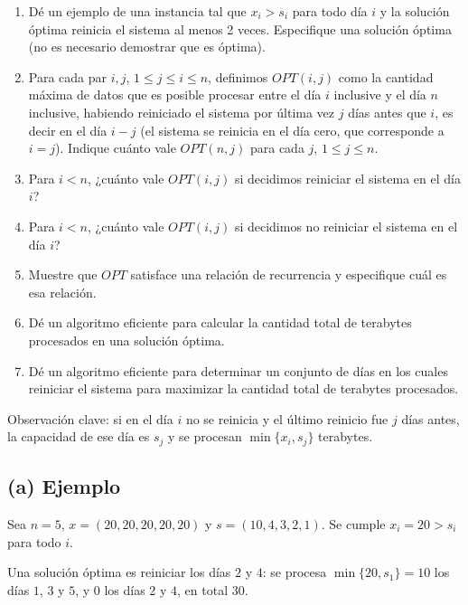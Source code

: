 \begin{enunciado}
\begin{enumerate}[label=(\alph*)]
\item Dé un ejemplo de una instancia tal que $x_i>s_i$ para todo día $i$ y la solución óptima reinicia el sistema al menos 2 veces. Especifique una solución óptima (no es necesario demostrar que es óptima).
\item Para cada par $i,j$, $1\le j\le i\le n$, definimos $OPT(i,j)$ como la cantidad máxima de datos que es posible procesar entre el día $i$ inclusive y el día $n$ inclusive, habiendo reiniciado el sistema por última vez $j$ días antes que $i$, es decir en el día $i-j$ (el sistema se reinicia en el día cero, que corresponde a $i=j$). Indique cuánto vale $OPT(n,j)$ para cada $j$, $1\le j\le n$.
\item Para $i<n$, ¿cuánto vale $OPT(i,j)$ si decidimos reiniciar el sistema en el día $i$?
\item Para $i<n$, ¿cuánto vale $OPT(i,j)$ si decidimos no reiniciar el sistema en el día $i$?
\item Muestre que $OPT$ satisface una relación de recurrencia y especifique cuál es esa relación.
\item Dé un algoritmo eficiente para calcular la cantidad total de terabytes procesados en una solución óptima.
\item Dé un algoritmo eficiente para determinar un conjunto de días en los cuales reiniciar el sistema para maximizar la cantidad total de terabytes procesados.
\end{enumerate}
\end{enunciado}


Observación clave: si en el día $i$ no se reinicia y el último reinicio fue $j$ días antes, la capacidad de ese día es $s_j$ y se procesan $\min\{x_i,s_j\}$ terabytes.

\subsection*{(a) Ejemplo}

Sea $n=5$, $x=(20,20,20,20,20)$ y $s=(10,4,3,2,1)$. Se cumple $x_i=20>s_i$ para todo $i$.

Una solución óptima es reiniciar los días $2$ y $4$: se procesa $\min\{20,s_1\}=10$ los días $1$, $3$ y $5$, y $0$ los días $2$ y $4$, en total $30$.

